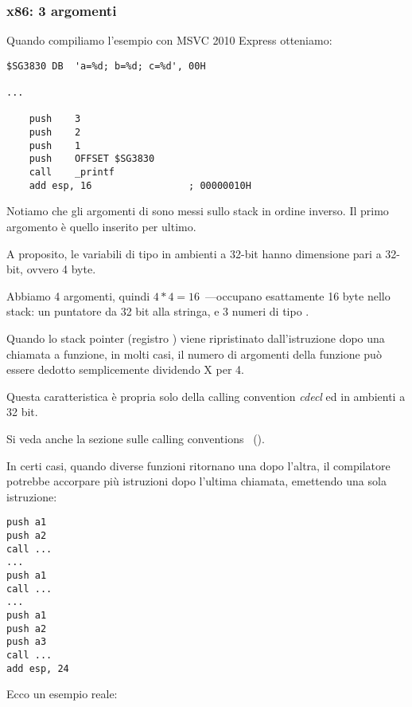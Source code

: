 \subsubsection{x86: 3 argomenti}


Quando compiliamo l'esempio con MSVC 2010 Express otteniamo:

\begin{lstlisting}[style=customasmx86]
$SG3830	DB	'a=%d; b=%d; c=%d', 00H

...

	push	3
	push	2
	push	1
	push	OFFSET $SG3830
	call	_printf
	add	esp, 16					; 00000010H
\end{lstlisting}

Notiamo che gli argomenti di \printf sono messi sullo stack in ordine inverso. Il primo argomento è quello inserito per ultimo.

A proposito, le variabili di tipo \Tint in ambienti a 32-bit hanno dimensione pari a 32-bit, ovvero 4 byte.

Abbiamo 4 argomenti, quindi $4*4 = 16$~---occupano esattamente 16 byte nello stack: un puntatore da 32 bit alla stringa, e 3 numeri di tipo \Tint.

Quando lo \gls{stack pointer} (registro \ESP) viene ripristinato dall'istruzione 
dopo una chiamata a funzione, in molti casi,
il numero di argomenti della funzione può essere dedotto semplicemente dividendo X per 4.

Questa caratteristica è propria solo della calling convention \emph{cdecl} ed in ambienti a 32 bit.

Si veda anche la sezione sulle calling conventions ~().

In certi casi, quando diverse funzioni ritornano una dopo l'altra, il compilatore potrebbe accorpare più istruzioni  dopo l'ultima chiamata, emettendo una sola istruzione:

\begin{lstlisting}[style=customasmx86]
push a1
push a2
call ...
...
push a1
call ...
...
push a1
push a2
push a3
call ...
add esp, 24
\end{lstlisting}

Ecco un esempio reale:



